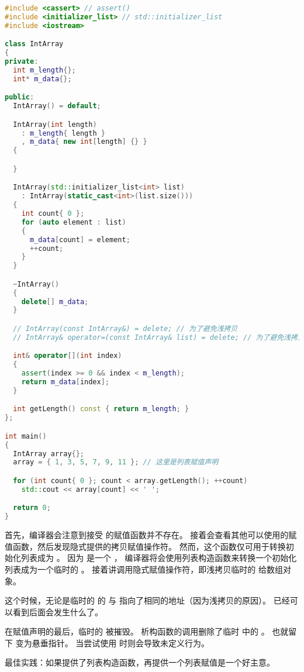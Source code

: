\documentclass[../../LearnCpp.tex]{subfiles}
\begin{document}
\begin{lstlisting}[language=C++]
#include <cassert> // assert()
#include <initializer_list> // std::initializer_list
#include <iostream>

class IntArray
{
private:
  int m_length{};
  int* m_data{};

public:
  IntArray() = default;

  IntArray(int length)
    : m_length{ length }
    , m_data{ new int[length] {} }
  {

  }

  IntArray(std::initializer_list<int> list)
    : IntArray(static_cast<int>(list.size()))
  {
    int count{ 0 };
    for (auto element : list)
    {
      m_data[count] = element;
      ++count;
    }
  }

  ~IntArray()
  {
    delete[] m_data;
  }

  // IntArray(const IntArray&) = delete; // 为了避免浅拷贝
  // IntArray& operator=(const IntArray& list) = delete; // 为了避免浅拷贝

  int& operator[](int index)
  {
    assert(index >= 0 && index < m_length);
    return m_data[index];
  }

  int getLength() const { return m_length; }
};

int main()
{
  IntArray array{};
  array = { 1, 3, 5, 7, 9, 11 }; // 这里是列表赋值声明

  for (int count{ 0 }; count < array.getLength(); ++count)
    std::cout << array[count] << ' ';

  return 0;
}
\end{lstlisting}

首先，编译器会注意到接受  的赋值函数并不存在。
接着会查看其他可以使用的赋值函数，然后发现隐式提供的拷贝赋值操作符。
然而，这个函数仅可用于转换初始化列表成为 。
因为  是一个 ，
编译器将会使用列表构造函数来转换一个初始化列表成为一个临时的 。
接着讲调用隐式赋值操作符，即浅拷贝临时的  给数组对象。

这个时候，无论是临时的  的  与  指向了相同的地址（因为浅拷贝的原因）。
已经可以看到后面会发生什么了。

在赋值声明的最后，临时的  被摧毁。
析构函数的调用删除了临时  中的 。
也就留下  变为悬垂指针。
当尝试使用  时则会导致未定义行为。

最佳实践：如果提供了列表构造函数，再提供一个列表赋值是一个好主意。
\end{document}

